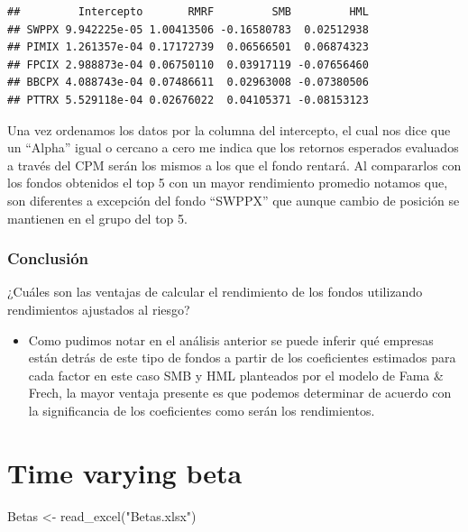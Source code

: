 \documentclass[
  12pt,
]{article}
\newenvironment{Shaded}{\begin{snugshade}}{\end{snugshade}}
\newcommand{\FunctionTok}[1]{\textcolor[rgb]{0.00,0.00,0.00}{#1}}
\newcommand{\NormalTok}[1]{#1}
\newcommand{\OtherTok}[1]{\textcolor[rgb]{0.56,0.35,0.01}{#1}}
\newcommand{\StringTok}[1]{\textcolor[rgb]{0.31,0.60,0.02}{#1}}
\providecommand{\tightlist}{%
  \setlength{\itemsep}{0pt}\setlength{\parskip}{0pt}}
\begin{document}
\begin{verbatim}
##         Intercepto       RMRF         SMB         HML
## SWPPX 9.942225e-05 1.00413506 -0.16580783  0.02512938
## PIMIX 1.261357e-04 0.17172739  0.06566501  0.06874323
## FPCIX 2.988873e-04 0.06750110  0.03917119 -0.07656460
## BBCPX 4.088743e-04 0.07486611  0.02963008 -0.07380506
## PTTRX 5.529118e-04 0.02676022  0.04105371 -0.08153123
\end{verbatim}

Una vez ordenamos los datos por la columna del intercepto, el cual nos
dice que un ``Alpha'' igual o cercano a cero me indica que los retornos
esperados evaluados a través del CPM serán los mismos a los que el fondo
rentará. Al compararlos con los fondos obtenidos el top 5 con un mayor
rendimiento promedio notamos que, son diferentes a excepción del fondo
``SWPPX'' que aunque cambio de posición se mantienen en el grupo del top
5.

\hypertarget{conclusiuxf3n}{%
\subsubsection{Conclusión}\label{conclusiuxf3n}}

¿Cuáles son las ventajas de calcular el rendimiento de los fondos
utilizando rendimientos ajustados al riesgo?

\begin{itemize}
\tightlist
\item
  Como pudimos notar en el análisis anterior se puede inferir qué
  empresas están detrás de este tipo de fondos a partir de los
  coeficientes estimados para cada factor en este caso SMB y HML
  planteados por el modelo de Fama \& Frech, la mayor ventaja presente
  es que podemos determinar de acuerdo con la significancia de los
  coeficientes como serán los rendimientos.
\end{itemize}

\hypertarget{time-varying-beta}{%
\section{Time varying beta}\label{time-varying-beta}}

\begin{Shaded}
\begin{Highlighting}[]
\NormalTok{Betas }\OtherTok{\textless{}{-}} \FunctionTok{read\_excel}\NormalTok{(}\StringTok{"Betas.xlsx"}\NormalTok{)}
\end{Highlighting}
\end{Shaded}
\end{document}
